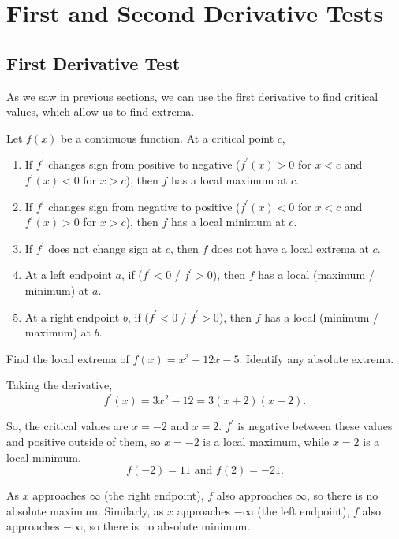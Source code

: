 \section{First and Second Derivative Tests}
\subsection{First Derivative Test}
As we saw in previous sections, we can use the first derivative to find critical values, which allow us to find extrema.
\begin{theorem}
	Let $f(x)$ be a continuous function.
	At a critical point $c$,
	\begin{enumerate}
		\item If $f^\prime$ changes sign from positive to negative ($f^\prime(x) > 0$ for $x < c$ and $f^\prime(x) < 0$ for $x > c$), then $f$ has a local maximum at $c$.
		\item If $f^\prime$ changes sign from negative to positive ($f^\prime(x) < 0$ for $x < c$ and $f^\prime(x) > 0$ for $x > c$), then $f$ has a local minimum at $c$.
		\item If $f^\prime$ does not change sign at $c$, then $f$ does not have a local extrema at $c$.
		\item At a left endpoint $a$, if ($f^\prime < 0$ / $f^\prime > 0$), then $f$ has a local (maximum / minimum) at $a$.
		\item At a right endpoint $b$, if ($f^\prime < 0$ / $f^\prime > 0$), then $f$ has a local (minimum / maximum) at $b$.
	\end{enumerate}
\end{theorem}

\begin{example}
	Find the local extrema of $f(x) = x^3 - 12x - 5$.
	Identify any absolute extrema.
\end{example}
\begin{answer}
	Taking the derivative,
	\begin{equation*}
		f^\prime(x) = 3x^2 - 12 = 3(x+2)(x-2).
	\end{equation*}
	
	So, the critical values are $x=-2$ and $x=2$.
	$f^\prime$ is negative between these values and positive outside of them, so $x=-2$ is a local maximum, while $x=2$ is a local minimum.
	\begin{equation*}
		f(-2) = 11 \text{ and } f(2) = -21.
	\end{equation*}
	
	As $x$ approaches $\infty$ (the right endpoint), $f$ also approaches $\infty$, so there is no absolute maximum.
	Similarly, as $x$ approaches $-\infty$ (the left endpoint), $f$ also approaches $-\infty$, so there is no absolute minimum.
\end{answer}


